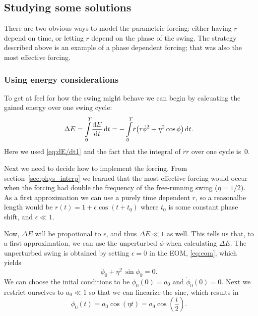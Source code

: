 \documentclass[11pt,letter, swedish, english,%
]{article}
\begin{document}
\subsection{Studying some solutions}
\newcommand{\DE}{\Delta{E}}
There are two obvious ways to model the parametric forcing: either
having $r$ depend on time, or letting $r$ depend on the phase of the
swing. The strategy described above is an example of a phase dependent
forcing; that was also the most effective forcing. 



\subsubsection{Using energy considerations}
To get at feel for how the swing might behave we can begin by
calcuating the gained energy over one swing cycle:
\begin{equation}\label{eq:DE1}
\DE=\int_0^T\!\dv{E}{t}\id{t}
=-\int_0^T\! \dot{r}\qty(r\dot{\phi}^2 + \eta^2\cos\phi)\id{t}.
\end{equation}
Here we used \eqref{eq:dE/dt1} and the fact that the integral of
$\dot{r}\ddot{r}$ over one cycle is~$0$. 

Next we need to decide how to implement the forcing. From
section~\ref{sec:phys_interp} we learned that the most effective
forcing would occur when the forcing had double the frequency of the
free-running swing ($\eta=1/2$). As a first approximation we can use a purely time
dependent $r$, so a reasonalbe length would be
$ %
r(t)=1+\epsilon\cos(t+t_0)
$ %
where $t_0$ is some constant phase shift, and $\epsilon\ll1$. 

Now, $\DE$ will be propotional to $\epsilon$, and thus $\DE\ll1$ as
well. This tells us that, to a first approximation, we can use the
unperturbed $\phi$ when calculating $\DE$. The unperturbed swing is
obtained by setting $\epsilon=0$ in the EOM, \eqref{eq:eom}, which
yields
\begin{equation}
\ddot\phi_0+\eta^2\,\sin\phi_0=0.
\end{equation}
We can choose the inital conditions to be $\phi_0(0)=a_0$ and
$\dot\phi_0(0)=0$. Next we restrict ourselves to $a_0\ll1$ so that we
can linearize the sine, which results in
\begin{equation}
\phi_0(t)=a_0\cos(\eta t)=a_0\cos(\frac{t}{2}).
\end{equation}
\end{document}
